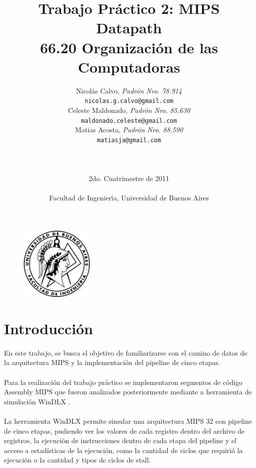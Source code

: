 \documentclass[a4paper,11pt]{article}
\title{ Trabajo Pr\'actico 2: MIPS Datapath   \\
        \Large{ 66.20 Organizaci\'on de las Computadoras } }
\author{Nicol\'as Calvo, \textit{Padr\'on Nro. 78.914}           	\\
            \texttt{ nicolas.g.calvo@gmail.com }      			\\
            Celeste Maldonado, \textit{Padr\'on Nro. 85.630}              	\\
            \texttt{ maldonado.celeste@gmail.com }                             \\
            Matias Acosta, \textit{Padr\'on Nro. 88.590}                \\
            \texttt{ matiasja@gmail.com }                     		\\
            \LARGE{}         						\\
            \LARGE{}         						\\
            \LARGE{}         						\\
            \Large{2do. Cuatrimestre de 2011}         	\\                       
            \texttt{}         						\\
            \Large{Facultad de Ingenier\'\i{}a, Universidad de Buenos Aires}            \\
       }
\date{}
\begin{document}
\begin{figure}
\centering
\includegraphics[width=100pt]{logofiuba.jpg}
\end{figure}


\maketitle
\thispagestyle{empty}   %


\newpage

\tableofcontents
\newpage

\setcounter{page}{1}

\section{Introducci\'on}

\paragraph{}
En este trabajo, se busca el objetivo de familiarizarse con el camino de datos de la arquitectura MIPS y la implementaci\'on del pipeline de cinco etapas. 

\paragraph{}
Para la realizaci\'on del trabajo pr\'actico se implementaron segmentos de c\'odigo Assembly MIPS que fueron analizados posteriormente mediante a herramienta de simulaci\'on WinDLX .

\paragraph{}
La herramienta WinDLX permite simular una arquitectura MIPS 32 con pipeline de cinco etapas, pudiendo ver los valores de cada registro dentro del archivo de registros, la ejecuci\'on de instrucciones dentro de cada etapa del pipeline  y el acceso a estad\'isticas  de la ejecuci\'on, como la cantidad de ciclos que requiri\'o la ejecuci\'on o la cantidad y tipos de ciclos de stall.
\end{document}

